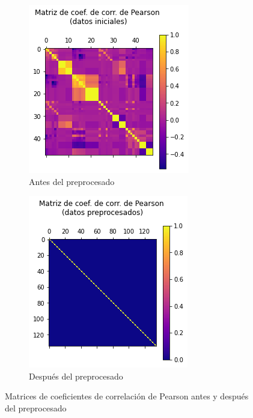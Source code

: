 \documentclass[10pt,a4paper]{article}
\begin{document}
\begin{figure}[h]
	\begin{subfigure}{0.5\textwidth}
		\centering
		\includegraphics[width=\textwidth]{cla_pearson_antes}
		\caption{Antes del preprocesado}
	\end{subfigure}
	\begin{subfigure}{0.5\textwidth}
		\centering
		\includegraphics[width=\textwidth]{cla_pearson_despues}
		\caption{Después del preprocesado}
	\end{subfigure}
	\caption{Matrices de coeficientes de correlación de Pearson antes y después del preprocesado}
	\label{fig:cla_pearson}
\end{figure}
\end{document}
